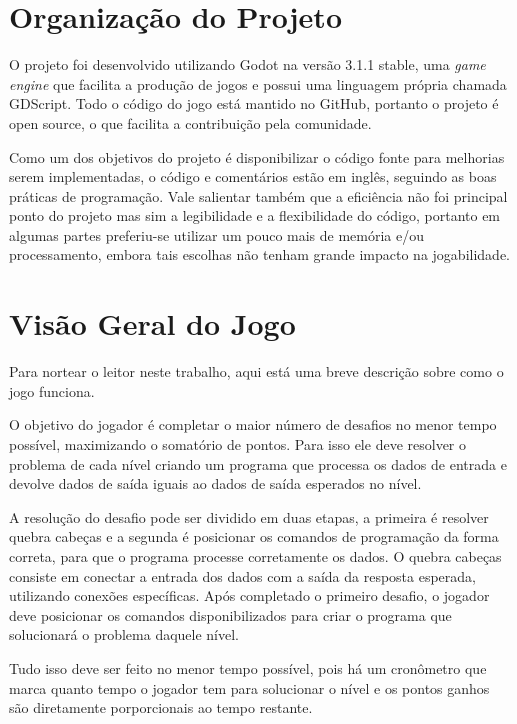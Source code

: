 \section{Organização do Projeto}
\label{sec:consideracoes_preliminares}

O projeto foi desenvolvido utilizando Godot na versão 3.1.1 stable, 
uma \textit{game engine} que facilita a produção de jogos e possui uma linguagem
própria chamada GDScript.
Todo o código do jogo está mantido no GitHub, portanto o projeto é open source,
o que facilita a contribuição pela comunidade.

Como um dos objetivos do projeto é disponibilizar o código fonte para
melhorias serem implementadas, o código e comentários estão em inglês, seguindo
as boas práticas de programação. Vale salientar também que a eficiência não foi
principal ponto do projeto mas sim a legibilidade e a flexibilidade do 
código, portanto em algumas partes preferiu-se utilizar um pouco mais de memória
e/ou processamento, embora tais escolhas não tenham grande impacto na 
jogabilidade.

\section{Visão Geral do Jogo}
\label{sec:consideracoes_preliminares}

Para nortear o leitor neste trabalho, aqui está uma breve descrição sobre como o
jogo funciona.

O objetivo do jogador é completar o maior número de desafios no menor tempo
possível, maximizando o somatório de pontos. Para isso ele deve resolver o 
problema de cada nível criando um programa que processa os dados de entrada e 
devolve dados de saída iguais ao dados de saída esperados no nível.

A resolução do desafio pode ser dividido em duas etapas, a primeira é resolver 
quebra cabeças e a segunda é posicionar os comandos de programação da forma 
correta, para que o programa processe corretamente os dados. O quebra cabeças 
consiste em conectar a entrada dos dados com a saída da resposta esperada, 
utilizando conexões específicas. 
Após completado o primeiro desafio, o jogador deve posicionar os comandos
disponibilizados para criar o programa que solucionará o problema daquele nível.

Tudo isso deve ser feito no menor tempo possível, pois há um cronômetro que 
marca quanto tempo o jogador tem para solucionar o nível e os pontos ganhos são 
diretamente porporcionais ao tempo restante.

